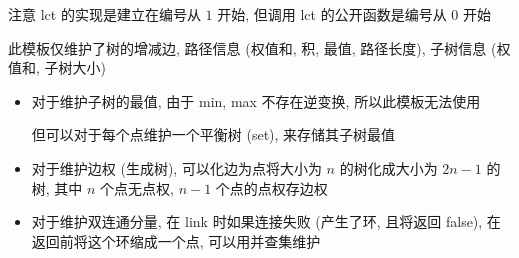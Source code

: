 注意 lct 的实现是建立在编号从 \(1\) 开始, 但调用 lct 的公开函数是编号从 \(0\) 开始

此模板仅维护了树的增减边, 路径信息 (权值和, 积, 最值, 路径长度), 子树信息 (权值和, 子树大小)

\begin{itemize}
    \item 对于维护子树的最值, 由于 min, max 不存在逆变换, 所以此模板无法使用
          
          但可以对于每个点维护一个平衡树 (set), 来存储其子树最值
          
    \item 对于维护边权 (生成树), 可以化边为点将大小为 \(n\) 的树化成大小为 \(2n - 1\) 的树, 其中 \(n\) 个点无点权, \(n-1\) 个点的点权存边权
    \item 对于维护双连通分量, 在 link 时如果连接失败 (产生了环, 且将返回 false), 在返回前将这个环缩成一个点, 可以用并查集维护
\end{itemize}